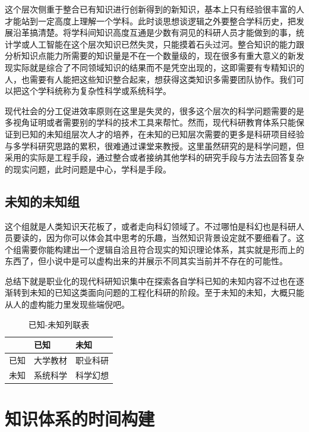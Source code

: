 \documentclass[]{tufte-book}
\begin{document}
这个层次侧重于整合已有知识进行创新得到的新知识，基本上只有经验很丰富的人才能站到一定高度上理解一个学科。此时谈思想谈逻辑之外要整合学科历史，把发展沿革搞清楚。将学科间知识高度互通是少数有洞见的科研人员才能做到的事，统计学或人工智能在这个层次知识已然失灵，只能摸着石头过河。整合知识的能力跟分析知识点能力所需要的知识量是不在一个数量级的，现在很多有重大意义的新发现实际就是综合了不同领域知识的结果而不是凭空出现的，这即需要有专精知识的人，也需要有人能把这些知识整合起来，想获得这类知识多需要团队协作。我们可以把这个学科统称为复杂性科学或系统科学。

现代社会的分工促进效率原则在这里是失灵的，很多这个层次的科学问题需要的是多视角证明或者需要别的学科的技术工具来帮忙。然而，现代科研教育体系只能保证到已知的未知组层次人才的培养，在未知的已知层次需要的更多是科研项目经验与多学科研究思路的累积，很难通过课堂来教授。这里虽然研究的是科学问题，但采用的实际是工程手段，通过整合或者接纳其他学科的研究手段与方法去回答复杂的现实问题，此时问题是中心，学科是手段。

\hypertarget{ux672aux77e5ux7684ux672aux77e5ux7ec4}{%
\subsection{未知的未知组}\label{ux672aux77e5ux7684ux672aux77e5ux7ec4}}

这个组就是人类知识天花板了，或者走向科幻领域了。不过哪怕是科幻也是科研人员要读的，因为你可以体会其中思考的乐趣，当然知识背景设定就不要细看了。这个组需要你能构建出一个逻辑自洽且符合现实的知识理论体系，其实就是形而上的东西了，但小说中是可以虚构出来的并展示不同其实当前并不存在的可能性。

总结下就是职业化的现代科研知识集中在探索各自学科已知的未知内容不过也在逐渐转到未知的已知这类面向问题的工程化科研的阶段。至于未知的未知，大概只能从人的虚构能力里发现些端倪吧。

\begin{table}

\caption{\label{tab:unnamed-chunk-1}已知-未知列联表}
\centering
\begin{tabular}[t]{lll}
\toprule
  & 已知 & 未知\\
\midrule
已知 & 大学教材 & 职业科研\\
未知 & 系统科学 & 科学幻想\\
\bottomrule
\end{tabular}
\end{table}

\hypertarget{ux77e5ux8bc6ux4f53ux7cfbux7684ux65f6ux95f4ux6784ux5efa}{%
\section{知识体系的时间构建}\label{ux77e5ux8bc6ux4f53ux7cfbux7684ux65f6ux95f4ux6784ux5efa}}
\end{document}
